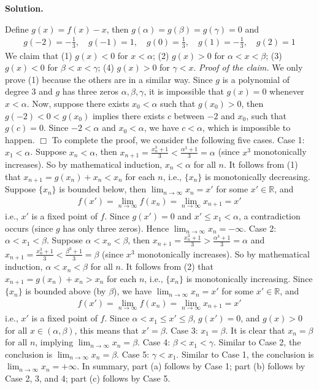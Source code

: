 \documentclass[12pt]{article}
\theoremstyle{definition}
\begin{document}
\smallskip
\noindent\textbf{Solution.}\quad

Define $g(x)=f(x)-x$, then $g(\alpha)=g(\beta)=g(\gamma)=0$ and
\begin{align*}
g(-2)=-\frac{1}{3},\quad g(-1)=1,\quad g(0)=\frac{1}{3},\quad g(1)=-\frac{1}{3},\quad g(2)=1
\end{align*}
We claim that 
(1) $g(x)<0$ for $x<\alpha$;
(2) $g(x)>0$ for $\alpha<x<\beta$;
(3) $g(x)<0$ for $\beta<x<\gamma$;
(4) $g(x)>0$ for $\gamma<x$.
\textit{Proof of the claim.} We only prove (1) because the others are in a similar way. Since $g$ is a polynomial of degree $3$ and $g$ has three zeros $\alpha,\beta,\gamma$, it is impossible that $g(x)=0$ whenever $x<\alpha$. Now, suppose there exists $x_0<\alpha$ such that $g(x_0)>0$, then $g(-2)<0<g(x_0)$ implies there exists $c$ between $-2$ and $x_0$, such that $g(c)=0$. Since $-2<\alpha$ and $x_0<\alpha$, we have $c<\alpha$, which is impossible to happen. $\Box$
To complete the proof, we consider the following five cases.
Case 1: $x_1<\alpha$. Suppose $x_n<\alpha$, then $x_{n+1}=\frac{x_n^3+1}{3}<\frac{\alpha^3+1}{3}=\alpha$ (since $x^3$ monotonically increases). So by mathematical induction, $x_n<\alpha$ for all $n$. It follows from (1) that $x_{n+1}=g(x_n)+x_n<x_n$ for each $n$, i.e., $\{x_n\}$ is monotonically decreasing. Suppose $\{x_n\}$ is bounded below, then $\lim_{n\to\infty}x_n=x'$ for some $x'\in \mathbb{R}$, and 
\begin{align*}
f(x')=\lim_{n\to\infty}f(x_n)=\lim_{n\to\infty}x_{n+1}=x'
\end{align*}
i.e., $x'$ is a fixed point of $f$. Since $g(x')=0$ and $x'\le x_1<\alpha$, a contradiction occurs (since $g$ has only three zeros). Hence $\lim_{n\to\infty}x_n=-\infty$.
Case 2: $\alpha<x_1<\beta$. Suppose $\alpha<x_n<\beta$, then $x_{n+1}=\frac{x_n^3+1}{3}>\frac{\alpha^3+1}{3}=\alpha$ and $x_{n+1}=\frac{x_n^3+1}{3}<\frac{\beta^3+1}{3}=\beta$ (since $x^3$ monotonically increases). So by mathematical induction, $\alpha<x_n<\beta$ for all $n$. It follows from (2) that $x_{n+1}=g(x_n)+x_n>x_n$ for each $n$, i.e., $\{x_n\}$ is monotonically increasing. Since $\{x_n\}$ is bounded above (by $\beta$), we have $\lim_{n\to\infty}x_n=x'$ for some $x'\in \mathbb{R}$, and 
\begin{align*}
f(x')=\lim_{n\to\infty}f(x_n)=\lim_{n\to\infty}x_{n+1}=x'
\end{align*}
i.e., $x'$ is a fixed point of $f$. Since $\alpha<x_1\le x'\le\beta$, $g(x')=0$, and $g(x)>0$ for all $x\in(\alpha,\beta)$, this means that $x'=\beta$.
Case 3: $x_1=\beta$. It is clear that $x_n=\beta$ for all $n$, implying $\lim_{n\to\infty}x_n=\beta$.
Case 4: $\beta<x_1<\gamma$. Similar to Case 2, the conclusion is $\lim_{n\to\infty}x_n=\beta$.
Case 5: $\gamma<x_1$. Similar to Case 1, the conclusion is $\lim_{n\to\infty}x_n=+\infty$.
In summary, part (a) follows by Case 1; part (b) follows by Case 2, 3, and 4; part (c) follows by Case 5.
\end{document}

